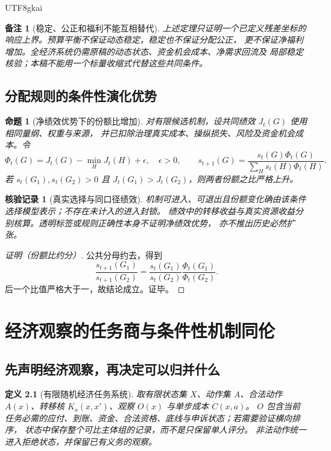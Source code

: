 \documentclass[12pt,a4paper,openany]{report}
\newtheorem{definition}{定义}[chapter]
\newtheorem{proposition}{命题}[chapter]
\newtheorem{remark}{备注}[chapter]
\newtheorem{Certificate}{核验记录}[chapter]
\newcommand{\Original}{原稿}
\begin{document}
\begin{CJK*}{UTF8}{gkai}
\begin{remark}[稳定、公正和福利不能互相替代]
上述定理只证明一个已定义残差坐标的响应上界。预算平衡不保证动态稳定，稳定也不保证分配公正，
更不保证净福利增加。全经济系统仍需\Original 的动态状态、资金机会成本、净需求回流及
局部稳定核验；本稿不能用一个标量收缩式代替这些共同条件。
\end{remark}

\section{分配规则的条件性演化优势}

\begin{proposition}[净绩效优势下的份额比增加]
\label{prop:selection}
对有限候选机制，设共同绩效 $J_t(G)$ 使用相同量纲、权重与来源，
并已扣除治理真实成本、操纵损失、风险及资金机会成本。令
\[
 \Phi_t(G)=J_t(G)-\min_HJ_t(H)+\epsilon,\quad\epsilon>0,
 \qquad
 s_{t+1}(G)=\frac{s_t(G)\Phi_t(G)}{\sum_Hs_t(H)\Phi_t(H)}.
\]
若 $s_t(G_1),s_t(G_2)>0$ 且 $J_t(G_1)>J_t(G_2)$，则两者份额之比严格上升。
\end{proposition}
\begin{Certificate}[真实选择与同口径绩效]
机制可进入、可退出且份额变化确由该条件选择模型表示；不存在未计入的进入封锁。
绩效中的转移收益与真实资源收益分别核算。透明标签或规则正确性本身不证明净绩效优势，
亦不推出历史必然扩张。
\end{Certificate}
\begin{proof}[证明（份额比约分）]
公共分母约去，得到
\[
 \frac{s_{t+1}(G_1)}{s_{t+1}(G_2)}
 =\frac{s_t(G_1)}{s_t(G_2)}\frac{\Phi_t(G_1)}{\Phi_t(G_2)}.
\]
后一个比值严格大于一，故结论成立。证毕。
\end{proof}

\chapter{经济观察的任务商与条件性机制同伦}
\label{chap:quotient}

\section{先声明经济观察，再决定可以归并什么}

\begin{definition}[有限随机经济任务系统]
\label{def:markov}
取有限状态集 $X$、动作集 $A$、合法动作 $A(x)$、转移核 $K_a(x,x')$、观察 $O(x)$ 与单步成本 $C(x,a)$。
$O$ 包含当前任务必需的应付、到账、资金、合法资格、底线与申诉状态；若需要验证横向排序，
状态中保存整个可比主体组的记录，而不是只保留单人评分。
非法动作统一进入拒绝状态，并保留已有义务的观察。
\end{definition}


\end{CJK*}
\end{document}
